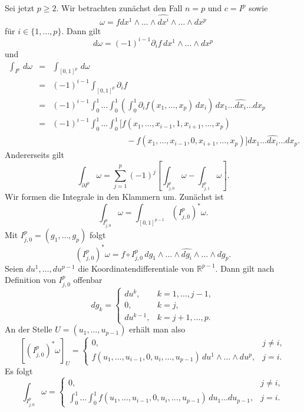\documentclass[a4paper,twoside,DIV15,BCOR12mm]{scrbook}
\begin{document}
\noindent
Sei jetzt $p \ge 2$. Wir betrachten zunächst den Fall $n = p$ und 
$c = I^{p}$ sowie
\begin{equation}\label{3.4.5a}
\omega = f dx^{1} \wedge \dots \wedge \widehat{dx^{i}} \wedge \dots 
\wedge dx^{p}
\end{equation}
für $i \in \{1,\dots,p\}$. Dann gilt
\[ d\omega = (-1)^{i-1} \partial_{i}f \, dx^{1} \wedge \dots \wedge 
dx^{p} \]
und
\begin{eqnarray*}
\int_{I^{p}} \, d\omega &= &\int_{[0,1]^{p}} \, d\omega \\
&=& 
(-1)^{i-1} \int_{[0,1]^{p}} \partial_{i} f \\
& = & (-1)^{i-1} \int_{0}^{1} \dots \int_{0}^{1} \left(\int_{0}^{1} 
\partial_{i}f (x_{1},\dots,x_{p}) \, dx_{i}\right)\, dx_{1} \dots 
\widehat{dx_{i}} \dots dx_{p} \\
& = & (-1)^{i-1} \int_{0}^{1} \dots \int_{0}^{1} 
[f(x_{1},\dots,x_{i-1},1,x_{i+1},\dots,x_{p}) \\
&&\qquad\qquad\qquad\qquad\quad -f(x_{1},\dots,x_{i-1},0,x_{i+1},\dots,x_{p})]  dx_{1} \dots 
\widehat{dx_{i}} \dots dx_{p}.
\end{eqnarray*}
Andererseits gilt
\[ \int_{\partial I^{p}} \omega = \sum_{j=1}^{p} (-1)^{j} \left[ 
\int_{I_{j,0}^{p}} \omega - \int_{I_{j,1}^{p}} \omega \right]. \]
Wir formen die Integrale in den Klammern um. Zunächst ist
\[ \int_{I_{j,0}^{p}} \omega = \int_{[0,1]^{p-1}} 
\left(I_{j,0}^{p}\right)^* \omega. \]
Mit $I_{j,0}^{p} = (g_{1},\dots,g_{p})$ folgt
\[ \left(I_{j,0}^{p}\right)^{*} \omega = f \circ I_{j,0}^{p} \, 
dg_{1} \wedge \dots \wedge \widehat{dg_{i}} \wedge \dots \wedge 
dg_{p}. \]
Seien $du^{1},\dots,du^{p-1}$ die Koordinatendifferentiale von 
${\mathbb R}^{p-1}$. Dann gilt nach Definition von $I_{j,0}^{p}$ 
offenbar
\[ dg_{k} = \left\{ \begin{array}{ll}
du^{k}, & k = 1,\dots,j-1, \\ 0, & k = j, \\ du^{k-1}, & k = 
j+1,\dots,p. \end{array} \right. \]
An der Stelle $U = (u_{1},\dots,u_{p-1})$ erhält man also
\[ \left[\left(I_{j,0}^{p}\right)^{*} \omega \right]_{U} = \left\{ 
\begin{array}{ll}
0,& j \not= i, \\ f(u_{1},\dots,u_{i-1},0,u_{i},\dots,u_{p-1}) \, 
du^{1} \wedge \dots \wedge du^{p},& j = i. \end{array} \right. \]
Es folgt
\[ \int_{I_{j,0}^{p}} \omega = \left\{ \begin{array}{ll}
0,& j \not= i, \\ \int_{0}^{1} \dots \int_{0}^{1} 
f(u_{1},\dots,u_{i-1},0,u_{i},\dots,u_{p-1}) \, du_{1} \dots du_{p-1},&
j = i. \end{array} \right. \]
\end{document}
